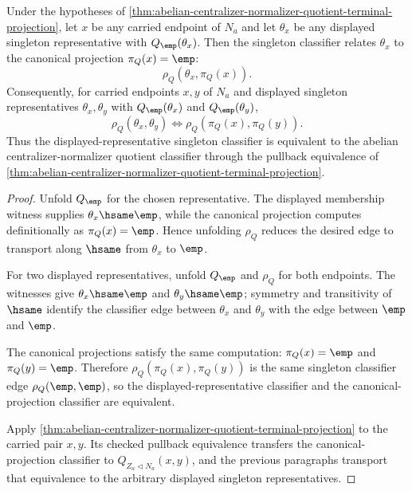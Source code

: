 \begin{theorem}
\label{thm:abelian-centralizer-normalizer-terminal-projection-uniqueness}
Under the hypotheses of
\autoref{thm:abelian-centralizer-normalizer-quotient-terminal-projection},
let $x$ be any carried endpoint of $N_a$ and let $\theta_x$ be any displayed
singleton representative with $Q_{\emp}(\theta_x)$. Then the singleton
classifier relates $\theta_x$ to the canonical projection $\pi_Q(x)=\emp$:
$$
\rho_Q(\theta_x,\pi_Q(x)).
$$
Consequently, for carried endpoints $x,y$ of $N_a$ and displayed singleton
representatives $\theta_x,\theta_y$ with $Q_{\emp}(\theta_x)$ and
$Q_{\emp}(\theta_y)$,
$$
\rho_Q(\theta_x,\theta_y)\Longleftrightarrow
\rho_Q(\pi_Q(x),\pi_Q(y)).
$$
Thus the displayed-representative singleton classifier is equivalent to the
abelian centralizer-normalizer quotient classifier through the pullback
equivalence of
\autoref{thm:abelian-centralizer-normalizer-quotient-terminal-projection}.
\end{theorem}
\begin{proof}
Unfold $Q_{\emp}$ for the chosen representative. The displayed membership
witness supplies $\theta_x\hsame\emp$, while the canonical projection computes
definitionally as $\pi_Q(x)=\emp$. Hence unfolding $\rho_Q$ reduces the desired
edge to transport along $\hsame$ from $\theta_x$ to $\emp$.

For two displayed representatives, unfold $Q_{\emp}$ and $\rho_Q$ for both
endpoints. The witnesses give $\theta_x\hsame\emp$ and
$\theta_y\hsame\emp$; symmetry and transitivity of $\hsame$ identify the
classifier edge between $\theta_x$ and $\theta_y$ with the edge between
$\emp$ and $\emp$.

The canonical projections satisfy the same computation:
$\pi_Q(x)=\emp$ and $\pi_Q(y)=\emp$. Therefore
$\rho_Q(\pi_Q(x),\pi_Q(y))$ is the same singleton classifier edge
$\rho_Q(\emp,\emp)$, so the displayed-representative classifier and the
canonical-projection classifier are equivalent.

Apply
\autoref{thm:abelian-centralizer-normalizer-quotient-terminal-projection} to
the carried pair $x,y$. Its checked pullback equivalence transfers the
canonical-projection classifier to
$Q_{Z_a\triangleleft N_a}(x,y)$, and the previous paragraphs transport that
equivalence to the arbitrary displayed singleton representatives.
\end{proof}

